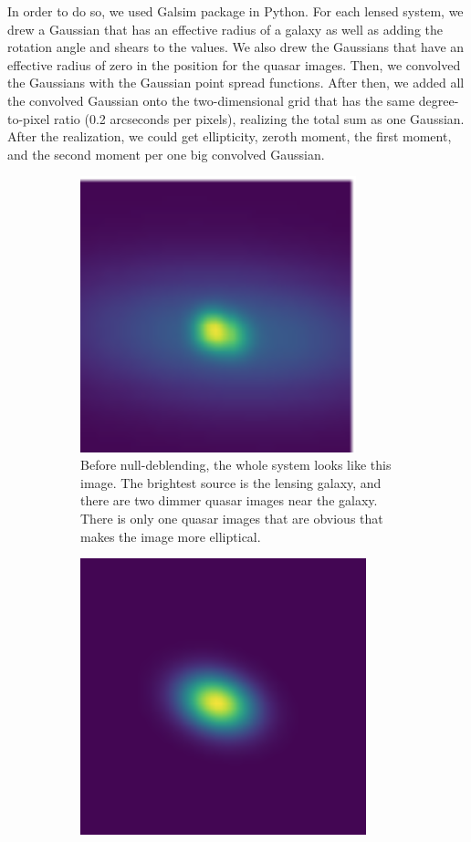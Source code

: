 \documentclass[\docopts]{\docclass}
\begin{document}
In order to do so, we used Galsim package in Python. For each lensed system, we drew a Gaussian that has an effective radius of a galaxy as well as adding the rotation angle and shears to the values. We also drew the Gaussians that have an effective radius of zero in the position for the quasar images. Then, we convolved the Gaussians with the Gaussian point spread functions. After then, we added all the convolved Gaussian onto the two-dimensional grid that has the same degree-to-pixel ratio (0.2 arcseconds per pixels), realizing the total sum as one Gaussian. After the realization, we could get ellipticity, zeroth moment, the first moment, and the second moment per one big convolved Gaussian.
\begin{figure}
    \centering
    \begin{subfigure}[bt]{0.48\linewidth}        %
        \centering
        \includegraphics[width=\linewidth, height=8cm]{beforenulldeblend.png}
        \caption{Before null-deblending, the whole system looks like this image. The brightest source is the lensing galaxy, and there are two dimmer quasar images near the galaxy. There is only one quasar images that are obvious that makes the image more elliptical.}
    \end{subfigure}
    \begin{subfigure}[bt]{0.48\linewidth}        %
        \centering
        \includegraphics[width=\linewidth, height=8cm]{afternulldeblend.png}

\end{subfigure}
\end{figure}
\end{document}
